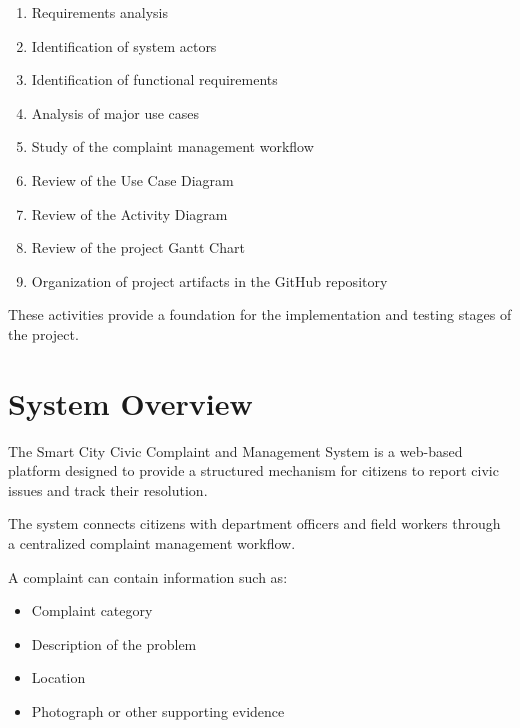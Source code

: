 \documentclass[12pt,a4paper]{article}
\begin{document}
\begin{enumerate}[leftmargin=*]

\item Requirements analysis

\item Identification of system actors

\item Identification of functional requirements

\item Analysis of major use cases

\item Study of the complaint management workflow

\item Review of the Use Case Diagram

\item Review of the Activity Diagram

\item Review of the project Gantt Chart

\item Organization of project artifacts in the GitHub repository

\end{enumerate}

These activities provide a foundation for the implementation and testing stages of the project.


\section{System Overview}

The Smart City Civic Complaint and Management System is a web-based platform designed to provide a structured mechanism for citizens to report civic issues and track their resolution.

The system connects citizens with department officers and field workers through a centralized complaint management workflow.

A complaint can contain information such as:

\begin{itemize}[leftmargin=*]

\item Complaint category

\item Description of the problem

\item Location

\item Photograph or other supporting evidence

\end{itemize}
\end{document}
